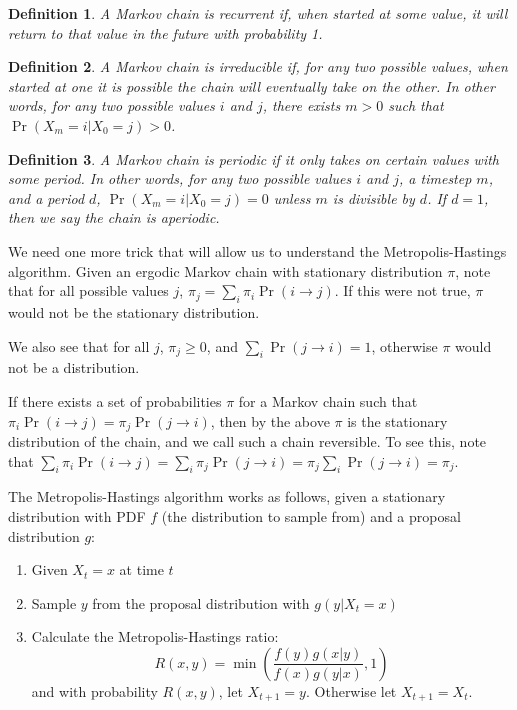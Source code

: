 \documentclass[12pt]{report}
\newtheorem{definition}{Definition}[chapter]
\begin{document}
\begin{definition}  
  A Markov chain is recurrent if, when started at some value, it will return to that value in the future with probability 1.
\end{definition}

\begin{definition}
  A Markov chain is irreducible if, for any two possible values, when started at one it is possible the chain will eventually take on the other. In other words, for any two possible values $i$ and $j$, there exists $m > 0$ such that \( \Pr(X_m = i | X_0 = j) > 0 \).
\end{definition}

\begin{definition}
  A Markov chain is periodic if it only takes on certain values with some period. In other words, for any two possible values $i$ and $j$, a timestep $m$, and a period $d$, \( \Pr(X_m = i | X_0 = j) = 0 \) unless $m$ is divisible by $d$. If $d = 1$, then we say the chain is aperiodic.
\end{definition}


We need one more trick that will allow us to understand the Metropolis-Hastings algorithm. Given an ergodic Markov chain with stationary distribution $\pi$, note that for all possible values $j$, $\pi_j = \sum_i \pi_i \Pr(i\to j)$. If this were not true, $\pi$ would not be the stationary distribution.

We also see that for all $j$, $\pi_j \ge 0$, and $\sum_i\Pr(j \to i) = 1$, otherwise $\pi$ would not be a distribution.

If there exists a set of probabilities $\pi$ for a Markov chain such that $\pi_i\Pr(i\to j) = \pi_j \Pr(j\to i)$, then by the above $\pi$ is the stationary distribution of the chain, and we call such a chain reversible. To see this, note that \( \sum_i \pi_i\Pr(i\to j) = \sum_i \pi_j\Pr(j\to i) = \pi_j \sum_i\Pr(j \to i) = \pi_j \).

The Metropolis-Hastings algorithm works as follows, given a stationary distribution with PDF $f$ (the distribution to sample from) and a proposal distribution $g$:

\begin{enumerate}[(1)]
  \item Given $X_t = x$ at time $t$
  \item Sample $y$ from the proposal distribution with $g(y|X_t = x)$
  \item Calculate the Metropolis-Hastings ratio: \[
    R(x, y) = \min\left( \dfrac{f(y)g(x|y)}{f(x)g(y|x)}, 1 \right)
  \]
  and with probability $R(x, y)$, let $X_{t+1} = y$. Otherwise let $X_{t+1} = X_t$.
\end{enumerate}
\end{document}
